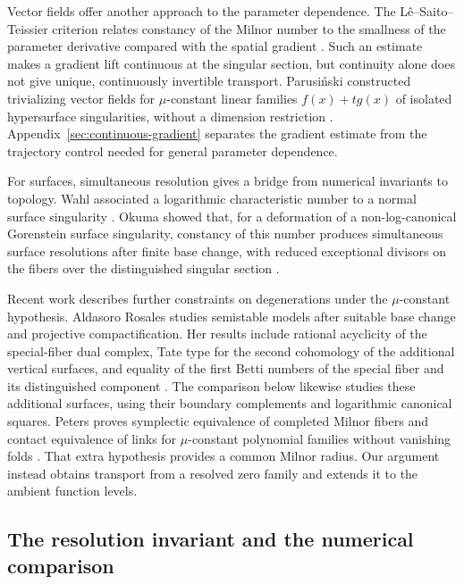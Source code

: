 Vector fields offer another approach to the parameter dependence.
The L\^e--Saito--Teissier criterion relates constancy of the Milnor
number to the smallness of the parameter derivative compared with the
spatial gradient \cite{LeSaito1973}\cite[Chapter~II, Remark~3.10]{Teissier1973}.
Such an estimate makes a gradient lift continuous at the singular
section, but continuity alone does not give unique, continuously
invertible transport.  Parusi\'nski constructed trivializing vector
fields for $\mu$-constant linear families $f(x)+tg(x)$ of isolated
hypersurface singularities, without a dimension restriction
\cite[Corollary~2.1]{Parusinski1999}.  Appendix~\ref{sec:continuous-gradient}
separates the gradient estimate from the trajectory control needed
for general parameter dependence.

For surfaces, simultaneous resolution gives a bridge from numerical
invariants to topology.  Wahl associated a logarithmic characteristic
number to a normal surface singularity \cite{Wahl1990}.
Okuma showed that, for a deformation of a non-log-canonical Gorenstein
surface singularity, constancy of this number produces simultaneous surface resolutions
after finite base change, with reduced exceptional divisors on the
fibers over the distinguished singular section
\cite[Theorem~1.2]{Okuma2004}.

Recent work describes further constraints on degenerations under the
$\mu$-constant hypothesis.  Aldasoro Rosales studies semistable models
after suitable base change and projective compactification.  Her
results include rational acyclicity of the special-fiber dual complex,
Tate type for the second cohomology of the additional vertical
surfaces, and equality of the first Betti numbers of the special fiber
and its distinguished component
\cite[Theorem~1.2]{AldasoroRosales2025}.  The comparison below likewise
studies these additional surfaces, using their boundary complements
and logarithmic canonical squares.  Peters proves symplectic
equivalence of completed Milnor fibers and contact equivalence of
links for $\mu$-constant polynomial families without vanishing folds
\cite[Theorem~3.7]{Peters2026}.  That extra hypothesis provides a common
Milnor radius.  Our argument instead obtains transport from a resolved
zero family and extends it to the ambient function levels.

\subsection*{The resolution invariant and the numerical comparison}

